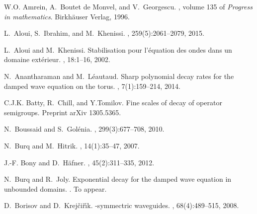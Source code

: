 \documentclass[10pt, a4paper,reqno]{amsart}
\theoremstyle{plain}
\theoremstyle{definition}
\theoremstyle{remark}
\begin{document}
\begin{thebibliography}{{Wak}14}

W.O. Amrein, A.~{Boutet de Monvel}, and V.~Georgescu.
, volume 135 of {\em Progress in mathematics}.
\newblock Birkh\"auser Verlag, 1996.

L.~{Aloui}, S.~{Ibrahim}, and M.~{Khenissi}.
, 259(5):2061--2079, 2015.

L.~Aloui and M.~Khenissi.
\newblock Stabilisation pour l'\'equation des ondes dans un domaine
  ext\'erieur.
, 18:1--16, 2002.

N.~Anantharaman and M.~L\'eautaud.
\newblock Sharp polynomial decay rates for the damped wave equation on the
  torus.
, 7(1):159--214, 2014.

C.J.K. Batty, R.~Chill, and Y.Tomilov.
\newblock Fine scales of decay of operator semigroups.
\newblock Preprint arXiv 1305.5365.

N.~{Boussaid} and S.~{Gol\'enia}.
, 299(3):677--708, 2010.

N.~{Burq} and M.~{Hitrik}.
, 14(1):35--47, 2007.

J.-F. Bony and D.~H\"afner.
,
  45(2):311--335, 2012.

N.~Burq and R.~Joly.
\newblock Exponential decay for the damped wave equation in unbounded domains.
.
\newblock To appear.

D.~Borisov and D.~{Krej\v ci\v r\'\i k}.
-symmectric waveguides.
, 68(4):489--515, 2008.


\end{thebibliography}
\end{document}
